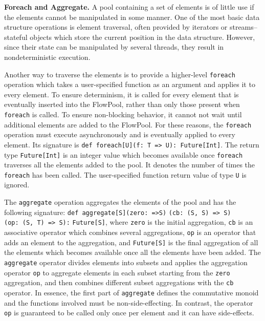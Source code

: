 \documentclass[runningheads,a4paper]{llncs}
\begin{document}

\textbf{Foreach and Aggregate.}
A pool containing a set of elements is of little use if the elements cannot be
manipulated in some manner. One of the most basic data structure operations is
element traversal, often provided by iterators or streams-- stateful objects
which store the current position in the data structure. However, since their
state can be manipulated by several threads, they result in nondeterministic
execution.

Another way to traverse the elements is to provide a higher-level
\verb=foreach= operation which takes a user-specified function as an
argument and
applies it to every element.
To ensure determinism, it is called for every element that is
eventually inserted into the FlowPool, rather than only those present
when \verb=foreach= is called.
To ensure non-blocking behavior, it cannot not wait until
additional elements are added to the FlowPool.
For these reasons, the \verb=foreach= operation must execute
asynchronously and is eventually applied to every element.
Its signature is \verb+def foreach[U](f: T => U): Future[Int]+.
The return type \verb=Future[Int]= is an integer value which becomes
available once \verb=foreach= traverses all the elements added to the
pool.
It denotes the number of times the \verb=foreach= has been called.
The user-specified function return value of type \verb=U= is ignored.

The \verb=aggregate= operation aggregates the elements of the pool
and has the following signature: \verb+def aggregate[S]+\verb+(zero: =>S)+
\verb+(cb: (S, S) => S)+\\
\verb+(op: (S, T) => S):+ \verb+Future[S]+,
where \verb=zero= is the initial aggregation, \verb=cb= is an
associative operator which combines several aggregations, \verb=op= is
an operator that adds an element to the aggregation, and
\verb=Future[S]= is the final aggregation of all the elements which
becomes available once all the elements have been added.
The \verb=aggregate= operator divides elements into subsets and applies the
aggregation operator \verb=op= to aggregate elements in each subset
starting from the \verb=zero= aggregation, and then combines
different subset aggregations with the \verb=cb= operator.
In essence, the first part of \verb=aggregate= defines the commutative
monoid and the functions involved must be non-side-effecting.
In contrast, the operator \verb=op= is guaranteed to be called only once per
element and it can have side-effects.
\end{document}
